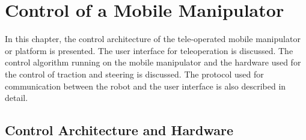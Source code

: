 \chapter{Control of a Mobile Manipulator }
\label{c5_Control}
In this chapter, the control architecture of the tele-operated  mobile manipulator or platform  is presented. The user interface for teleoperation is discussed. The control algorithm  running on the mobile manipulator and the hardware used for the control of traction and steering is discussed. The protocol used  for communication between the robot and the user interface is also described in detail.
\section{Control Architecture and Hardware}


